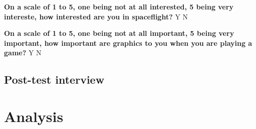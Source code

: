 \vspace{5mm}
\noindent\textbf{On a scale of 1 to 5, one being not at all interested, 5 being very intereste, how interested are you in spaceflight?} Y N

\vspace{5mm}
\noindent\textbf{On a scale of 1 to 5, one being not at all important, 5 being very important, how important are graphics to you when you are playing a game?} Y N

\subsection{Post-test interview}

\section{Analysis}





